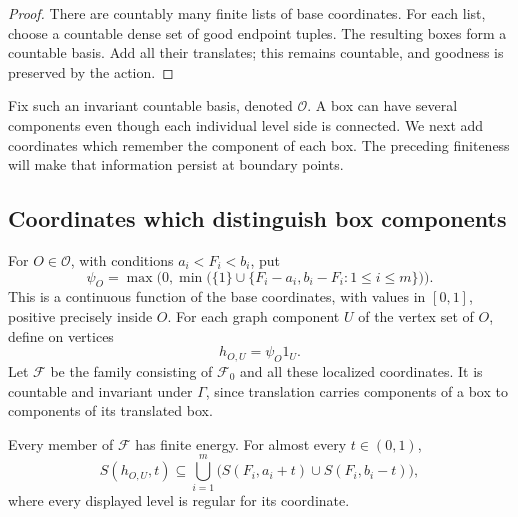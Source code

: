 \begin{proof}
There are countably many finite lists of base coordinates.  For each
list, choose a countable dense set of good endpoint tuples.  The
resulting boxes form a countable basis.  Add all their translates;
this remains countable, and goodness is preserved by the action.
\end{proof}

Fix such an invariant countable basis, denoted $\mathcal O$.  A box can
have several components even though each individual level side is
connected.  We next add coordinates which remember the component of
each box.  The preceding finiteness will make that information
persist at boundary points.

\subsection{Coordinates which distinguish box components}

For $O\in\mathcal O$, with conditions $a_i<F_i<b_i$, put
\[
 \psi_O=\max\bigl(0,\min\bigl(\{1\}\cup
                   \{F_i-a_i,b_i-F_i:1\le i\le m\}\bigr)\bigr).
\]
This is a continuous function of the base coordinates, with values in
$[0,1]$, positive precisely inside $O$.  For each graph component $U$
of the vertex set of $O$, define on vertices
\begin{equation}\label{compact:localized}
 h_{O,U}=\psi_O1_U.
\end{equation}
Let $\mathcal F$ be the family consisting of $\mathcal F_0$ and all
these localized coordinates.  It is countable and invariant under
$\Gamma$, since translation carries components of a box to components
of its translated box.

\begin{lemma}\label{compact:localized-energy}
Every member of $\mathcal F$ has finite energy.  For almost every
$t\in(0,1)$,
\begin{equation}\label{compact:shifted-walls}
 S(h_{O,U},t)\subseteq
 \bigcup_{i=1}^m
       \bigl(S(F_i,a_i+t)\cup S(F_i,b_i-t)\bigr),
\end{equation}
where every displayed level is regular for its coordinate.
\end{lemma}

